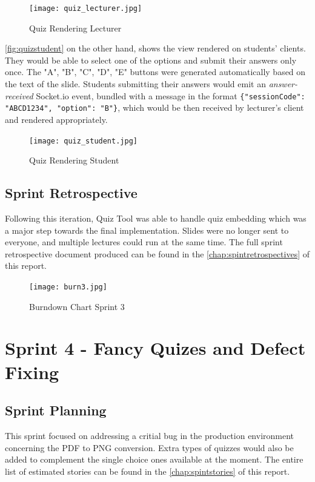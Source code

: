 \begin{figure}[h!]
    \centering
    \texttt{[image: quiz\_lecturer.jpg]}
    \caption{Quiz Rendering Lecturer}
    \label{fig:quizlecturer}
\end{figure}

\autoref{fig:quizstudent} on the other hand, shows the view rendered on students'
clients. They would be able to select one of the options and submit their answers
only once. The "A", "B", "C", "D", "E" buttons were generated automatically based
on the text of the slide. Students submitting their answers would emit an \textit{answer-received}
Socket.io event, bundled with a message in the format \texttt{\{"sessionCode": "ABCD1234", "option": "B"\}},
which would be then received by lecturer's client and rendered appropriately.

\begin{figure}[h!]
    \centering
    \texttt{[image: quiz\_student.jpg]}
    \caption{Quiz Rendering Student}
    \label{fig:quizstudent}
\end{figure}

\subsection{Sprint Retrospective}
Following this iteration, Quiz Tool was able to handle quiz embedding which was a major
step towards the final implementation. Slides were no longer sent to everyone,
and multiple lectures could run at the same time.
The full sprint retrospective document produced can be found in the
\autoref{chap:spintretrospectives} of this report.

\begin{figure}[h!]
    \centering
    \texttt{[image: burn3.jpg]}
    \caption{Burndown Chart Sprint 3}
    \label{fig:burn3}
\end{figure}

\newpage
\section{Sprint 4 - Fancy Quizes and Defect Fixing}
\subsection{Sprint Planning}
This sprint focused on addressing a critial bug in the production environment
concerning the PDF to PNG conversion. Extra types of quizzes would also be added
to complement the single choice ones available at the moment. The entire list of estimated stories
can be found in the \autoref{chap:spintstories} of this report.

